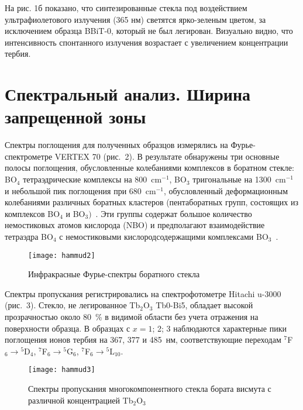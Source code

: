 \documentclass[press]{vestnik}
\begin{document}
На рис. 1б показано, что синтезированные стекла под воздействием 
ультрафиолетового излучения (365 нм) светятся ярко-зеленым цветом, за 
исключением образца BBiT-0, который не был легирован. Визуально видно, что 
интенсивность спонтанного излучения возрастает с увеличением концентрации 
тербия.

\section{Спектральный анализ. Ширина запрещенной зоны}

Спектры поглощения для полученных образцов измерялись на Фурье-спектрометре 
VERTEX 70 (рис.~2). В результате обнаружены три основные полосы поглощения, 
обусловленные колебаниями комплексов в боратном стекле: BO$_{4}$ 
тетраэдрические комплексы на 800~cm$^{-1}$, BO$_{3}$ тригональные на 1300~cm$^{-1}$ и небольшой пик поглощения при 680~cm$^{-1}$, обусловленный 
деформационным колебаниями различных боратных кластеров (пентаборатных 
групп, состоящих из комплексов BO$_{4}$ и BO$_{3})$~\cite{B09,B10,B11,B12,B13}. Эти группы 
содержат большое количество немостиковых атомов кислорода (NBO) и 
предполагают взаимодействие тетраэдра BO$_{4}$ с немостиковыми 
кислородсодержащими комплексами BO$_{3}$~\cite{B09}.

\begin{figure}
\centerline{\texttt{[image: hammud2]}}
\caption{Инфракрасные Фурье-спектры боратного стекла}
\label{fig2}
\end{figure}

Спектры пропускания регистрировались на спектрофотометре Hitachi u-3000 
(рис.~3). Стекло, не легированное Tb$_{2}$O$_{3}$ Tb0-Bi5, обладает высокой 
прозрачностью около 80~{\%} в видимой области без учета отражения на 
поверхности образца. В образцах с $x= 1$; 2; 3 наблюдаются характерные пики 
поглощения ионов тербия на 367, 377 и 485~нм, соответствующие переходам 
$^{7}$F$_{6} \to {}^{5}$D$_{4}$, $^{7}$F$_{6} \to {}^{5}$G$_{6}$, 
$^{7}$F$_{6} \to {}^{5}$L$_{10}$.

\begin{figure}
\centerline{\texttt{[image: hammud3]}}
\caption{Спектры пропускания многокомпонентного стекла бората висмута с 
различной концентрацией Tb$_{2}$O$_{3}$}
\label{fig3}
\end{figure}
\end{document}
